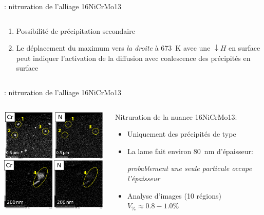 \documentclass[aspectratio=169,pdf,t]{beamer}
\begin{document}
\begin{frame}{\insertsection}{\insertsubsection: nitruration de l'alliage 16NiCrMo13}
\begin{columns}[T]
\begin{column}{0.55\textwidth}
\begin{enumerate}
        \item Possibilit\'e de précipitation secondaire
        \vspace{0.5cm}
  
        \item Le déplacement du maximum vers \emph{la droite} à \SI{673}{\kelvin} avec une $\downarrow{}H$ en surface peut indiquer l'activation de la diffusion avec coalescence des précipités en surface
      \end{enumerate}
    \end{column}
  \end{columns}
\end{frame}


\begin{frame}{\insertsection}{\insertsubsection: nitruration de l'alliage 16NiCrMo13}
	\begin{columns}[T]
		\begin{column}{0.45\textwidth}
			\centering{}
			\vspace{0.6cm}
			\includegraphics[width=6cm]{figures/tem-aero-cartography}
		\end{column}
		\begin{column}{0.55\textwidth}
			\vspace{0.6cm}
			Nitruration de la nuance 16NiCrMo13:
			\begin{itemize}
  			\item Uniquement des précipités de type 
  			\vspace{0.6cm}
  			
  			\item La lame fait environ \SI{80}{\nano\metre} d'\'epaisseur:
  			\begin{center}
    			\emph{probablement une seule particule occupe l'\'epaisseur}
  			\end{center}
  			\vspace{0.6cm}
  			
  			\item Analyse d'images (10 régions) $V_{\%}\approx{}\num{0,8}-\num{1,0}\%$
  			\vspace{0.6cm}
  			

\end{itemize}
\end{column}
\end{columns}
\end{frame}
\end{document}
